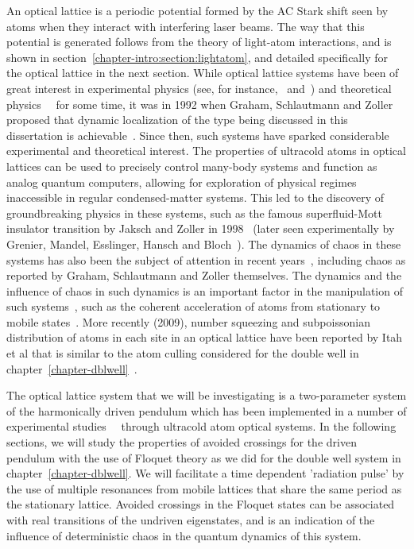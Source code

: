 An optical lattice is a periodic potential formed by the AC Stark shift seen by atoms when they interact with interfering laser beams. The way that this potential is generated follows from the theory of light-atom interactions, and is shown in section~\ref{chapter-intro:section:lightatom}, and detailed specifically for the optical lattice in the next section. While optical lattice systems have been of great interest in experimental physics (see, for instance,~\cite{oplattice:oldexpt} and~\cite{oplattice:oldexpt2}) and theoretical physics~\cite{oplattice:oldtheory}~\cite{oplattice:oldtheory2} for some time, it was in 1992 when Graham, Schlautmann and Zoller proposed that dynamic localization of the type being discussed in this dissertation is achievable~\cite{graham}. Since then, such systems have sparked considerable experimental and theoretical interest.  The properties of ultracold atoms in optical lattices can be used to precisely control many-body systems and  function as analog quantum computers, allowing for exploration of physical regimes inaccessible in regular condensed-matter systems. This led to the discovery of groundbreaking physics in these systems, such as the famous superfluid-Mott insulator transition by Jaksch and Zoller in 1998~\cite{sfmi:theory} (later seen experimentally by Grenier, Mandel,  Esslinger, Hansch and Bloch~\cite{sfmi:expt}). The dynamics of chaos in these systems has also been the subject of attention in recent years~\cite{graham}, including chaos as reported by Graham, Schlautmann and Zoller themselves. The dynamics and the influence of chaos in such dynamics is an important factor in the manipulation of such systems~\cite{raizen:oplattice}, such as the coherent acceleration of atoms from stationary to mobile states~\cite{holder:reichl:2res}. More recently (2009), number squeezing and subpoissonian distribution of atoms in each site in an optical lattice have been reported by Itah et al that is similar to the atom culling considered for the double well in chapter~\ref{chapter-dblwell}~\cite{technion:oplattice-culling}.

The optical lattice system that we will be investigating is a two-parameter system of the harmonically driven pendulum which has been implemented in a number of experimental studies~\cite{steck}~\cite{luter:reichl:3res} through ultracold atom optical systems. In the following sections, we will study the properties of avoided crossings for the driven pendulum with the use of Floquet theory as we did for the double well system in chapter~\ref{chapter-dblwell}. We will facilitate a time dependent 'radiation pulse' by the use of multiple resonances from mobile lattices that share the same period as the stationary lattice. Avoided crossings in the Floquet states can be associated with real transitions of the undriven eigenstates, and is an indication of the influence of deterministic chaos in the quantum dynamics of this system.

